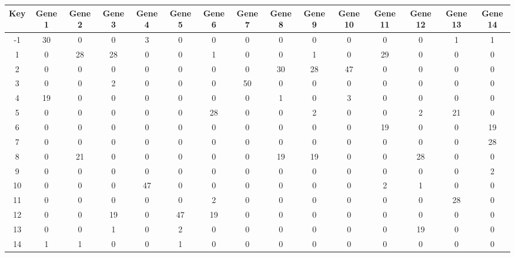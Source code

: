 \begin{tabular}{|c|c|c|c|c|c|c|c|c|c|c|c|c|c|c|}
\hline
Key & Gene 1 & Gene 2 & Gene 3 & Gene 4 & Gene 5 & Gene 6 & Gene 7 & Gene 8 & Gene 9 & Gene 10 & Gene 11 & Gene 12 & Gene 13 & Gene 14 \\
\hline
-1 & 30 & 0 & 0 & 3 & 0 & 0 & 0 & 0 & 0 & 0 & 0 & 0 & 1 & 1 \\
1 & 0 & 28 & 28 & 0 & 0 & 1 & 0 & 0 & 1 & 0 & 29 & 0 & 0 & 0 \\
2 & 0 & 0 & 0 & 0 & 0 & 0 & 0 & 30 & 28 & 47 & 0 & 0 & 0 & 0 \\
3 & 0 & 0 & 2 & 0 & 0 & 0 & 50 & 0 & 0 & 0 & 0 & 0 & 0 & 0 \\
4 & 19 & 0 & 0 & 0 & 0 & 0 & 0 & 1 & 0 & 3 & 0 & 0 & 0 & 0 \\
5 & 0 & 0 & 0 & 0 & 0 & 28 & 0 & 0 & 2 & 0 & 0 & 2 & 21 & 0 \\
6 & 0 & 0 & 0 & 0 & 0 & 0 & 0 & 0 & 0 & 0 & 19 & 0 & 0 & 19 \\
7 & 0 & 0 & 0 & 0 & 0 & 0 & 0 & 0 & 0 & 0 & 0 & 0 & 0 & 28 \\
8 & 0 & 21 & 0 & 0 & 0 & 0 & 0 & 19 & 19 & 0 & 0 & 28 & 0 & 0 \\
9 & 0 & 0 & 0 & 0 & 0 & 0 & 0 & 0 & 0 & 0 & 0 & 0 & 0 & 2 \\
10 & 0 & 0 & 0 & 47 & 0 & 0 & 0 & 0 & 0 & 0 & 2 & 1 & 0 & 0 \\
11 & 0 & 0 & 0 & 0 & 0 & 2 & 0 & 0 & 0 & 0 & 0 & 0 & 28 & 0 \\
12 & 0 & 0 & 19 & 0 & 47 & 19 & 0 & 0 & 0 & 0 & 0 & 0 & 0 & 0 \\
13 & 0 & 0 & 1 & 0 & 2 & 0 & 0 & 0 & 0 & 0 & 0 & 19 & 0 & 0 \\
14 & 1 & 1 & 0 & 0 & 1 & 0 & 0 & 0 & 0 & 0 & 0 & 0 & 0 & 0 \\
\hline
\end{tabular}